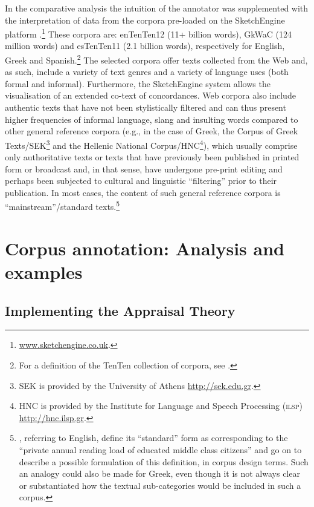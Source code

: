 \documentclass[output=paper]{LSP/langsci}
\begin{document}
In the comparative analysis the intuition of the annotator was supplemented with the interpretation of data from the corpora pre-loaded on the SketchEngine platform \citep{Kilgarriff2004}.\footnote{\url{www.sketchengine.co.uk}.} These corpora are: enTenTen12 (11+ billion words), GkWaC (124 million words) and esTenTen11 (2.1 billion words), respectively for English, Greek and Spanish.\footnote{For a definition of the TenTen collection of corpora, see \citet{ Jakubicek2013}.} The selected corpora offer texts collected from the Web and, as such, include a variety of text genres and a variety of language uses (both formal and informal). Furthermore, the SketchEngine system allows the visualisation of an extended co-text of concordances. Web corpora also include authentic texts that have not been stylistically filtered and can thus present higher frequencies of informal language, slang and insulting words compared to other general reference corpora (e.g., in the case of Greek, the Corpus of Greek Texts/\textsc{SEK}\footnote{\textsc{SEK} is provided by the University of Athens \url{http://sek.edu.gr}.} and the Hellenic National Corpus/\textsc{HNC}\footnote{\textsc{HNC} is provided by the Institute for Language and Speech Processing (\textsc{ilsp}) \url{http://hnc.ilsp.gr}.}), which usually comprise only authoritative texts or texts that have previously been published in printed form or broadcast and, in that sense, have undergone pre-print editing and perhaps been subjected to cultural and linguistic “filtering” prior to their publication. In most cases, the content of such general reference corpora is “mainstream”/standard texts.\footnote{\citet[65--66]{Teubert2007}, referring to English, define its “standard” form as corresponding to the “private annual reading load of educated middle class citizens” and go on to describe a possible formulation of this definition, in corpus design terms. Such an analogy could also be made for Greek, even though it is not always clear or substantiated how the textual sub-categories would be included in such a corpus.}

\section{Corpus annotation: Analysis and examples} \label{sec:2:4} 
\subsection{Implementing the Appraisal Theory} \label{sec:2:4:1}
\end{document}
